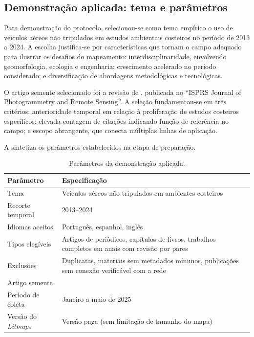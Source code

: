 \documentclass[portuguese]{textolivre}
\begin{document}
\subsection{Demonstração aplicada: tema e parâmetros}\label{sec-titulo}
Para demonstração do protocolo, selecionou-se como tema empírico o uso de veículos aéreos não tripulados em estudos ambientais costeiros no período de 2013 a 2024. A escolha justifica-se por características que tornam o campo adequado para ilustrar os desafios do mapeamento: interdisciplinaridade, envolvendo geomorfologia, ecologia e engenharia; crescimento acelerado no período considerado; e diversificação de abordagens metodológicas e tecnológicas.

	O artigo semente selecionado foi a revisão de \textcite{Colomina2014}, publicada no “ISPRS Journal of Photogrammetry and Remote Sensing”. A seleção fundamentou-se em três critérios: anterioridade temporal em relação à proliferação de estudos costeiros específicos; elevada contagem de citações indicando função de referência no campo; e escopo abrangente, que conecta múltiplas linhas de aplicação.

    A  sintetiza os parâmetros estabelecidos na etapa de preparação.

\begin{table}[htbp]
\centering
\begin{threeparttable}
\caption{Parâmetros da demonstração aplicada.}
\label{tab2}

\begin{tabularx}{\textwidth}{>{\raggedright\arraybackslash}p{3.6cm}X}
\toprule
\textbf{Parâmetro} & \textbf{Especificação} \\
\midrule
Tema &
Veículos aéreos não tripulados em ambientes costeiros \\

Recorte temporal &
2013--2024 \\

Idiomas aceitos &
Português, espanhol, inglês \\

Tipos elegíveis &
Artigos de periódicos, capítulos de livros, trabalhos completos em anais com revisão por pares \\

Exclusões &
Duplicatas, materiais sem metadados mínimos, publicações sem conexão verificável com a rede \\

Artigo semente &
\textcite{Colomina2014} \\

Período de coleta &
Janeiro a maio de 2025 \\

Versão do \textit{Litmaps} &
Versão paga (sem limitação de tamanho do mapa) \\
\bottomrule
\end{tabularx}


\end{threeparttable}
\end{table}
\end{document}
